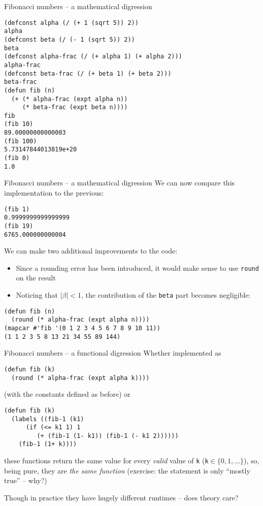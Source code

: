 \documentclass[presentation]{beamer}
\begin{document}
\begin{frame}[fragile]{Fibonacci numbers -- a mathematical digression}
\begin{verbatim}
(defconst alpha (/ (+ 1 (sqrt 5)) 2))
alpha
(defconst beta (/ (- 1 (sqrt 5)) 2))
beta
(defconst alpha-frac (/ (+ alpha 1) (+ alpha 2)))
alpha-frac
(defconst beta-frac (/ (+ beta 1) (+ beta 2)))
beta-frac
(defun fib (n)
  (+ (* alpha-frac (expt alpha n))
     (* beta-frac (expt beta n))))
fib
(fib 10)
89.00000000000003
(fib 100)
5.73147844013819e+20
(fib 0)
1.0
\end{verbatim}
\end{frame}

\begin{frame}[fragile]{Fibonacci numbers -- a mathematical digression}
We can now compare this implementation to the previous:
\begin{verbatim}
(fib 1)
0.9999999999999999
(fib 19)
6765.000000000004
\end{verbatim}
We can make two additional improvements to the code:
\begin{itemize}
\item Since a rounding error has been introduced, it would make sense to use \texttt{round} on the result
\item Noticing that $\vert\beta\vert<1$, the contribution of the \texttt{beta} part becomes negligible:
\end{itemize}
\begin{verbatim}
(defun fib (n)
  (round (* alpha-frac (expt alpha n))))
(mapcar #'fib '(0 1 2 3 4 5 6 7 8 9 10 11))
(1 1 2 3 5 8 13 21 34 55 89 144)
\end{verbatim}
\end{frame}

\begin{frame}[fragile]{Fibonacci numbers -- a functional digression}
Whether implemented as
\begin{verbatim}
(defun fib (k)
  (round (* alpha-frac (expt alpha k))))
\end{verbatim}
(with the constants defined as before) or
\begin{verbatim}
(defun fib (k)
  (labels ((fib-1 (k1)
      (if (<= k1 1) 1
         (+ (fib-1 (1- k1)) (fib-1 (- k1 2))))))
    (fib-1 (1+ k))))
\end{verbatim}
these functions return the same value for every \emph{valid} value of \texttt{k} (\texttt{k}$\in\{0,1,...\}$), so, being pure, they are \emph{the same function} (exercise: the statement is only ``mostly true'' -- why?)

Though in practice they have hugely different runtimes -- does theory care?
\end{frame}
\end{document}

